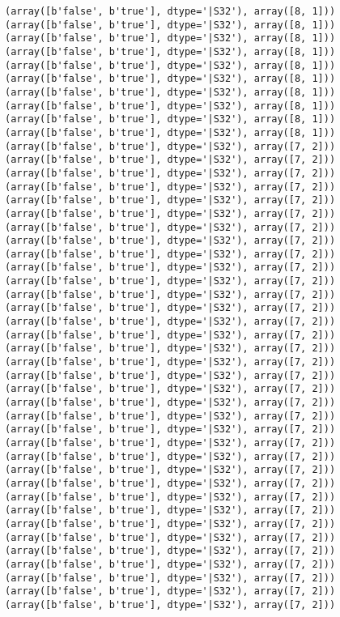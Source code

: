 \documentclass[11pt]{article}
\begin{document}
\begin{Verbatim}[commandchars=\\\{\}]
(array([b'false', b'true'], dtype='|S32'), array([8, 1]))
(array([b'false', b'true'], dtype='|S32'), array([8, 1]))
(array([b'false', b'true'], dtype='|S32'), array([8, 1]))
(array([b'false', b'true'], dtype='|S32'), array([8, 1]))
(array([b'false', b'true'], dtype='|S32'), array([8, 1]))
(array([b'false', b'true'], dtype='|S32'), array([8, 1]))
(array([b'false', b'true'], dtype='|S32'), array([8, 1]))
(array([b'false', b'true'], dtype='|S32'), array([8, 1]))
(array([b'false', b'true'], dtype='|S32'), array([8, 1]))
(array([b'false', b'true'], dtype='|S32'), array([8, 1]))
(array([b'false', b'true'], dtype='|S32'), array([7, 2]))
(array([b'false', b'true'], dtype='|S32'), array([7, 2]))
(array([b'false', b'true'], dtype='|S32'), array([7, 2]))
(array([b'false', b'true'], dtype='|S32'), array([7, 2]))
(array([b'false', b'true'], dtype='|S32'), array([7, 2]))
(array([b'false', b'true'], dtype='|S32'), array([7, 2]))
(array([b'false', b'true'], dtype='|S32'), array([7, 2]))
(array([b'false', b'true'], dtype='|S32'), array([7, 2]))
(array([b'false', b'true'], dtype='|S32'), array([7, 2]))
(array([b'false', b'true'], dtype='|S32'), array([7, 2]))
(array([b'false', b'true'], dtype='|S32'), array([7, 2]))
(array([b'false', b'true'], dtype='|S32'), array([7, 2]))
(array([b'false', b'true'], dtype='|S32'), array([7, 2]))
(array([b'false', b'true'], dtype='|S32'), array([7, 2]))
(array([b'false', b'true'], dtype='|S32'), array([7, 2]))
(array([b'false', b'true'], dtype='|S32'), array([7, 2]))
(array([b'false', b'true'], dtype='|S32'), array([7, 2]))
(array([b'false', b'true'], dtype='|S32'), array([7, 2]))
(array([b'false', b'true'], dtype='|S32'), array([7, 2]))
(array([b'false', b'true'], dtype='|S32'), array([7, 2]))
(array([b'false', b'true'], dtype='|S32'), array([7, 2]))
(array([b'false', b'true'], dtype='|S32'), array([7, 2]))
(array([b'false', b'true'], dtype='|S32'), array([7, 2]))
(array([b'false', b'true'], dtype='|S32'), array([7, 2]))
(array([b'false', b'true'], dtype='|S32'), array([7, 2]))
(array([b'false', b'true'], dtype='|S32'), array([7, 2]))
(array([b'false', b'true'], dtype='|S32'), array([7, 2]))
(array([b'false', b'true'], dtype='|S32'), array([7, 2]))
(array([b'false', b'true'], dtype='|S32'), array([7, 2]))
(array([b'false', b'true'], dtype='|S32'), array([7, 2]))
(array([b'false', b'true'], dtype='|S32'), array([7, 2]))
(array([b'false', b'true'], dtype='|S32'), array([7, 2]))
(array([b'false', b'true'], dtype='|S32'), array([7, 2]))
(array([b'false', b'true'], dtype='|S32'), array([7, 2]))
(array([b'false', b'true'], dtype='|S32'), array([7, 2]))

\end{Verbatim}
\end{document}
